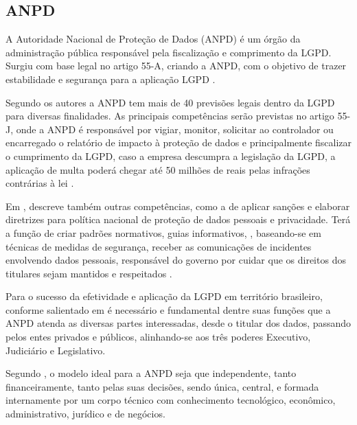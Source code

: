 \documentclass[
	12pt,				%
	openright,			%
	oneside,			%
	a4paper,			%
	english,			%
	french,				%
	spanish,			%
	brazil,				%
	]{abntex2}
\begin{document}
\subsection{ANPD}

A Autoridade Nacional de Proteção de Dados (ANPD) é um órgão da administração pública responsável pela fiscalização e comprimento da LGPD. Surgiu com base legal no artigo 55-A, criando a ANPD, com o objetivo de trazer estabilidade e segurança para a aplicação LGPD \cite{Pinheiro2021}.

Segundo os autores  a ANPD tem mais de 40 previsões legais dentro da LGPD para diversas finalidades. As principais competências serão previstas no artigo 55-J, onde a ANPD é responsável por vigiar, monitor, solicitar ao controlador ou encarregado o relatório de impacto à proteção de dados e principalmente fiscalizar o cumprimento da LGPD, caso a empresa descumpra a legislação da LGPD, a aplicação de multa poderá chegar até 50 milhões de reais pelas infrações contrárias à lei \cite{Motta}.  

Em , descreve também outras competências, como a de aplicar sanções e elaborar diretrizes para política nacional de proteção de dados pessoais e privacidade. Terá a função de criar padrões normativos, guias informativos, \cite{LGPD12Magalhaes2020}, baseando-se em técnicas de medidas de segurança, receber as comunicações de incidentes envolvendo dados pessoais, responsável do governo por cuidar que os direitos dos titulares sejam mantidos e respeitados \cite{Gutierrez}.

Para o sucesso da efetividade e aplicação da LGPD em território brasileiro, conforme salientado em  é necessário e fundamental dentre suas funções que a ANPD atenda as diversas partes interessadas, desde o titular dos dados, passando pelos entes privados e públicos, alinhando-se aos três poderes Executivo, Judiciário e Legislativo.

Segundo ,  o modelo ideal para a ANPD seja que independente, tanto financeiramente, tanto pelas suas decisões, sendo única, central, e formada internamente por um corpo técnico com conhecimento tecnológico, econômico, administrativo, jurídico e de negócios.
\end{document}
